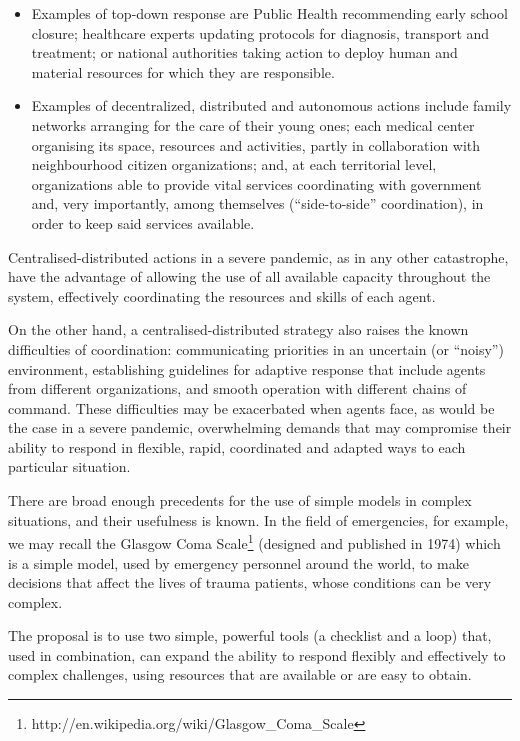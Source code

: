 \documentclass[12pt, a4]{scrartcl}
\begin{document}
\begin{itemize}
	\item Examples of top-down response are Public Health recommending early school closure; healthcare experts updating protocols for diagnosis, transport and treatment; or national authorities taking action to deploy human and material resources for which they are responsible.
	\item Examples of decentralized, distributed and autonomous actions include family networks arranging for the care of their young ones; each medical center organising its space, resources and activities, partly in collaboration with neighbourhood citizen organizations; and, at each territorial level, organizations able to provide vital services coordinating with government and, very importantly, among themselves (“side-to-side” coordination), in order to keep said services available.
\end{itemize}

Centralised-distributed actions in a severe pandemic, as in any other catastrophe, have the advantage of allowing the use of all available capacity throughout the system, effectively coordinating the resources and skills of each agent.

On the other hand, a centralised-distributed strategy also raises the known difficulties of coordination: communicating priorities in an uncertain (or “noisy”) environment, establishing guidelines for adaptive response that include agents from different organizations, and smooth operation with different chains of command. These difficulties may be exacerbated when agents face, as would be the case in a severe pandemic, overwhelming demands that may compromise their ability to respond in flexible, rapid, coordinated and adapted ways to each particular situation.

There are broad enough precedents for the use of simple models in complex situations, and their usefulness is known. In the field of emergencies, for example, we may recall the Glasgow Coma Scale\footnote{http://en.wikipedia.org/wiki/Glasgow_Coma_Scale} (designed and published in 1974) which is a simple model, used by emergency personnel around the world, to make decisions that affect the lives of trauma patients, whose conditions can be very complex.

The proposal is to use two simple, powerful tools (a checklist and a loop) that, used in combination, can expand the ability to respond flexibly and effectively to complex challenges, using resources that are available or are easy to obtain.
\end{document}
